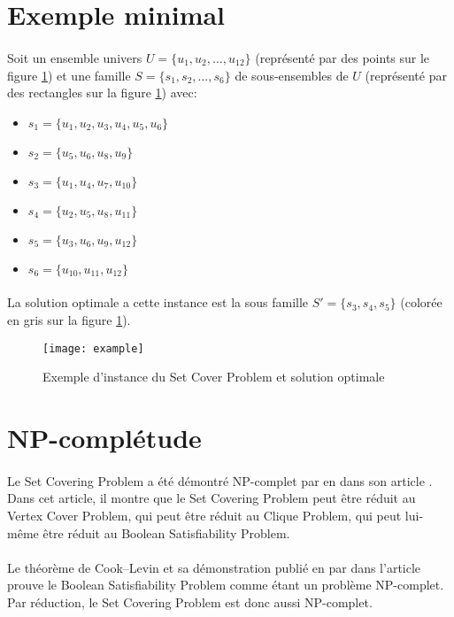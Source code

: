 \documentclass[12pt,letterpaper,twoside]{article}
\begin{document}
	\section{Exemple minimal}
		\paragraph*{}
			Soit un ensemble univers \(U = \{u_1, u_2, \dots, u_{12}\}\) (représenté par des points sur le figure \ref{fig:example}) et une famille \(S = \{s_1, s_2, \dots, s_6\}\) de sous-ensembles de \(U\) (représenté par des rectangles sur la figure \ref{fig:example}) avec:
			\begin{itemize}
				\item \(s_1 = \{u_1, u_2, u_3, u_4, u_5, u_6\}\)
				\item \(s_2 = \{u_5, u_6, u_8, u_9\}\)
				\item \(s_3 = \{u_1, u_4, u_7, u_{10}\}\)
				\item \(s_4 = \{u_2, u_5, u_8, u_{11}\}\)
				\item \(s_5 = \{u_3, u_6, u_9, u_{12}\}\)
				\item \(s_6 = \{u_{10}, u_{11}, u_{12}\}\)
			\end{itemize}
		\paragraph*{}
			La solution optimale a cette instance est la sous famille \(S'=\{s_3, s_4, s_5\}\) (colorée en gris sur la figure \ref{fig:example}).
		\begin{figure}[H]
			\centering%
			\texttt{[image: example]}%
			\caption{Exemple d'instance du Set Cover Problem et solution optimale\cite{Mount2017}}%
			\label{fig:example}%
		\end{figure}
	\section{NP-complétude}
		\paragraph*{}
			Le Set Covering Problem a été démontré NP-complet par \citeauthor{Karp1972} en \citeyear{Karp1972} dans son article \cite{Karp1972}. Dans cet article, il montre que le Set Covering Problem peut être réduit au Vertex Cover Problem, qui peut être réduit au Clique Problem, qui peut lui-même être réduit au Boolean Satisfiability Problem.
		\paragraph*{}
			Le théorème de Cook–Levin et sa démonstration publié en \citeyear{Cook1971} par \citeauthor{Cook1971} dans l'article \cite{Cook1971} prouve le Boolean Satisfiability Problem comme étant un problème NP-complet. Par réduction, le Set Covering Problem est donc aussi NP-complet.
	\newpage\printbibliography[heading=bibintoc]{}
\end{document}
